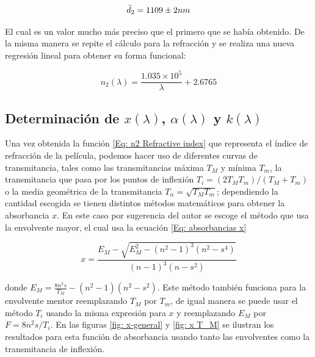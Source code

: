 \documentclass[article]{article}
\begin{document}
\begin{multicols}{2}
        \begin{equation}
            \Bar{d}_2=1109\pm 2 nm
        \end{equation}
        
        El cual es un valor mucho más preciso que el primero que se había obtenido. De la misma manera se repite el cálculo para la refracción y se realiza una nueva regresión lineal para obtener su forma funcional:
        
        \begin{equation}
            n_2(\lambda)=\frac{1.035\times10^5}{\lambda}+2.6765
            \label{Eq: n2 Refractive index}
        \end{equation}
        
        
        \subsection{Determinación de $x(\lambda)$, $\alpha (\lambda)$ y $k(\lambda)$}
        
        Una vez obtenida la función \ref{Eq: n2 Refractive index} que representa el índice de refracción de la película, podemos hacer uso de diferentes curvas de transmitancia, tales como las transmitancias máxima $T_M$ y mínima $T_m$, la transmitancia que pasa por los puntos de inflexión $T_i=(2T_MT_m)/(T_M+T_m)$ o la media geométrica de la transmitancia $T_{\alpha}=\sqrt{T_MT_m}$; dependiendo la cantidad escogida se tienen distintos métodos matemáticos para obtener la absorbancia $x$. En este caso por sugerencia del autor se escoge el método que usa la envolvente mayor, el cual usa la ecuación \ref{Eq: absorbancias x}
        
        \begin{equation}
            x=\frac{E_M-\sqrt{E^2_M-(n^2-1)^3(n^2-s^4)}}{(n-1)^3(n-s^2)}
            \label{Eq: absorbancias x}
        \end{equation}
        
        donde $E_M=\frac{8n^2s}{T_M}-(n^2-1)(n^2-s^2)$. Este método también funciona para la envolvente mentor reemplazando $T_M$ por $T_m$, de igual manera se puede usar el método $T_i$ usando la misma expresión para $x$ y reemplazando $E_M$ por $F=8n^2s/T_i$. En las figuras \ref{fig: x-general} y \ref{fig: x T_M} se ilustran los resultados para esta función de absorbancia usando tanto las envolventes como la transmitancia de inflexión.
        

\end{multicols}
\end{document}
